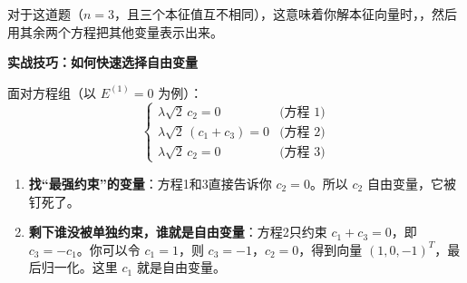 对于这道题（$n=3$，且三个本征值互不相同），这意味着你解本征向量时，，然后用其余两个方程把其他变量表示出来。

\textbf{实战技巧：如何快速选择自由变量}

面对方程组（以 $E^{(1)}=0$ 为例）：
\[
\begin{cases}
\lambda\sqrt{2} \, c_2 = 0 & \text{(方程 1)} \\
\lambda\sqrt{2} \, (c_1 + c_3) = 0 & \text{(方程 2)} \\
\lambda\sqrt{2} \, c_2 = 0 & \text{(方程 3)}
\end{cases}
\]

\begin{enumerate}
    \item \textbf{找``最强约束''的变量}：方程1和3直接告诉你 $c_2 = 0$。所以 $c_2$ 自由变量，它被钉死了。
    \item \textbf{剩下谁没被单独约束，谁就是自由变量}：方程2只约束 $c_1 + c_3 = 0$，即 $c_3 = -c_1$。你可以令 $c_1 = 1$，则 $c_3 = -1$，$c_2 = 0$，得到向量 $(1, 0, -1)^T$，最后归一化。这里 $c_1$ 就是自由变量。
\end{enumerate}


